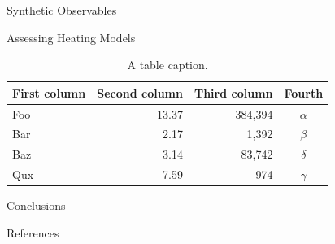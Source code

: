 \documentclass[final]{beamer}
\newlength{\sepwidth}
\newlength{\colwidth}
\newcommand{\separatorcolumn}{\begin{column}{\sepwidth}\end{column}}
\begin{document}
\begin{frame}[t]
\begin{columns}[t]
\begin{column}{\colwidth}
\begin{block}{Synthetic Observables}
  \end{block}

  \begin{alertblock}{Assessing Heating Models}

    \begin{table}
      \centering
      \begin{tabular}{l r r c}
        \toprule
        \textbf{First column} & \textbf{Second column} & \textbf{Third column} & \textbf{Fourth} \\
        \midrule
        Foo & 13.37 & 384,394 & $\alpha$ \\
        Bar & 2.17 & 1,392 & $\beta$ \\
        Baz & 3.14 & 83,742 & $\delta$ \\
        Qux & 7.59 & 974 & $\gamma$ \\
        \bottomrule
      \end{tabular}
      \caption{A table caption.}
    \end{table}

  \end{alertblock}

  \begin{block}{Conclusions}
    
  \end{block}

  \begin{block}{References}
    \scriptsize
    \begin{multicols}{2}
      
      
    \end{multicols}
  \end{block}

\end{column}

\separatorcolumn
\end{columns}
\end{frame}
\end{document}

